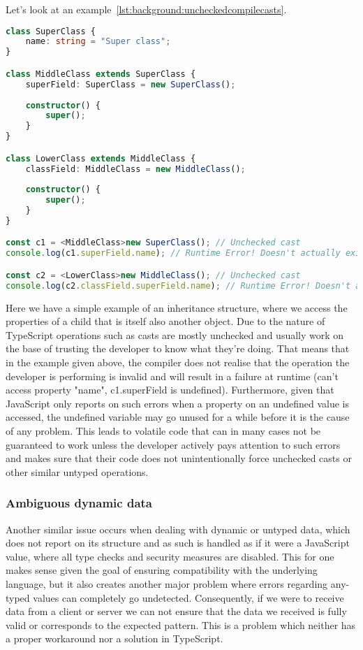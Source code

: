 Let's look at an example~\ref{lst:background:uncheckedcompilecasts}.

\begin{lstlisting}[language=TypeScript,caption=Unchecked compile-time casts in TypeScript,label=lst:background:uncheckedcompilecasts]
class SuperClass {
	name: string = "Super class";
}

class MiddleClass extends SuperClass {
	superField: SuperClass = new SuperClass();
	
	constructor() {
		super();
	}
}

class LowerClass extends MiddleClass {
	classField: MiddleClass = new MiddleClass();
	
	constructor() {
		super();
	}
}

const c1 = <MiddleClass>new SuperClass(); // Unchecked cast
console.log(c1.superField.name); // Runtime Error! Doesn't actually exist

const c2 = <LowerClass>new MiddleClass(); // Unchecked cast
console.log(c2.classField.superField.name); // Runtime Error! Doesn't actually exist
\end{lstlisting}

Here we have a simple example of an inheritance structure, where we access the properties of a child that is itself also another object. Due to the nature of TypeScript operations such as casts are mostly unchecked and usually work on the base of trusting the developer to know what they're doing. That means that in the example given above, the compiler does not realise that the operation the developer is performing is invalid and will result in a failure at runtime (can't access property "name", c1.superField is undefined). Furthermore, given that JavaScript only reports on such errors when a property on an undefined value is accessed, the undefined variable may go unused for a while before it is the cause of any problem. This leads to volatile code that can in many cases not be guaranteed to work unless the developer actively pays attention to such errors and makes sure that their code does not unintentionally force unchecked casts or other similar untyped operations.

\subsubsection{Ambiguous dynamic data}

Another similar issue occurs when dealing with dynamic or untyped data, which does not report on its structure and as such is handled as if it were a JavaScript value, where all type checks and security measures are disabled. This for one makes sense given the goal of ensuring compatibility with the underlying language, but it also creates another major problem where errors regarding any-typed values can completely go undetected. Consequently, if we were to receive data from a client or server we can not ensure that the data we received is fully valid or corresponds to the expected pattern. This is a problem which neither has a proper workaround nor a solution in TypeScript. 

